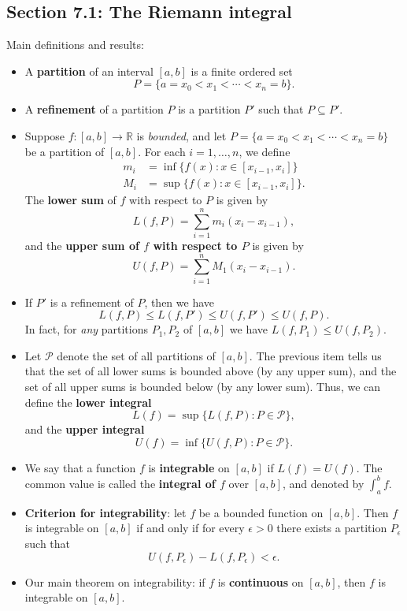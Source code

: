 \documentclass[letterpaper,12pt]{article}
\newcommand{\R}{\mathbb{R}}
\begin{document}
\subsection*{Section 7.1: The Riemann integral}
Main definitions and results:
\begin{itemize}
 \item A {\bf partition} of an interval $[a,b]$ is a finite ordered set
\[
 P=\{a=x_0<x_1<\cdots<x_n=b\}.
\]
 \item A {\bf refinement} of a partition $P$ is a partition $P'$ such that $P\subseteq P'$.
 \item Suppose $f:[a,b]\to \R$ is {\em bounded}, and let $P=\{a=x_0<x_1<\cdots <x_n=b\}$ be a partition of $[a,b]$. For each $i=1,\ldots,n$, we define
\begin{align*}
 m_i & = \inf\{f(x) : x\in [x_{i-1},x_i]\}\\
 M_i & = \sup\{f(x) : x\in [x_{i-1},x_i]\}.
\end{align*}
The {\bf lower sum} of $f$ with respect to $P$ is given by
\[
 L(f,P) = \sum_{i=1}^n m_i (x_i-x_{i-1}),
\]
and the {\bf upper sum of $f$ with respect to $P$} is given by
\[
 U(f,P) = \sum_{i=1}^n M_1 (x_i-x_{i-1}).
\]
\item If $P'$ is a refinement of $P$, then we have
\[
 L(f,P)\leq L(f,P')\leq U(f,P')\leq U(f,P).
\]
In fact, for {\em any} partitions $P_1,P_2$ of $[a,b]$ we have $L(f,P_1)\leq U(f,P_2)$.
\item Let $\mathcal{P}$ denote the set of all partitions of $[a,b]$. The previous item tells us that the set of all lower sums is bounded above (by any upper sum), and the set of all upper sums is bounded below (by any lower sum). Thus, we can define the {\bf lower integral}
\[
 L(f) = \sup\{L(f,P) : P\in\mathcal{P}\},
\]
and the {\bf upper integral}
\[
 U(f) = \inf\{U(f,P) : P\in\mathcal{P}\}.
\]
\item We say that a function $f$ is {\bf integrable} on $[a,b]$ if $L(f)=U(f)$. The common value is called the {\bf integral of $f$} over $[a,b]$, and denoted by $\int_a^b f$.
\item {\bf Criterion for integrability}: let $f$ be a bounded function on $[a,b]$. Then $f$ is integrable on $[a,b]$ if and only if for every $\epsilon>0$ there exists a partition $P_\epsilon$ such that
\[
 U(f,P_\epsilon)-L(f,P_\epsilon)<\epsilon.
\]
\item Our main theorem on integrability: if $f$ is {\bf continuous} on $[a,b]$, then $f$ is integrable on $[a,b]$.
\end{itemize}
\end{document}

